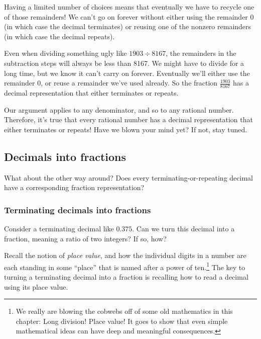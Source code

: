 Having a limited number of choices means that eventually we have to recycle one of those remainders! We can't go on forever without either using the remainder 0 (in which case the decimal terminates) or reusing one of the nonzero remainders (in which case the decimal repeats).

Even when dividing something ugly like $1903 \div 8167$, the remainders in the subtraction steps will always be less than 8167. We might have to divide for a long time, but we know it can't carry on forever. Eventually we'll either use the remainder 0, or reuse a remainder we've used already. So the fraction $\frac{1903}{8167}$ has a decimal representation that either terminates or repeats.

Our argument applies to any denominator, and so to any rational number. Therefore, it's true that every rational number has a decimal representation that either terminates or repeats! Have we blown your mind yet? If not, stay tuned.

\subsection{Decimals into fractions}

What about the other way around? Does every terminating-or-repeating decimal have a corresponding fraction representation?

\subsubsection{Terminating decimals into fractions}

Consider a terminating decimal like $0.375$. Can we turn this decimal into a fraction, meaning a ratio of two integers? If so, how?

Recall the notion of \textit{place value}, and how the individual digits in a number are each standing in some ``place'' that is named after a power of ten.\footnote{We really are blowing the cobwebs off of some old mathematics in this chapter: Long division! Place value! It goes to show that even simple mathematical ideas can have deep and meaningful consequences.} The key to turning a terminating decimal into a fraction is recalling how to read a decimal using its place value.

